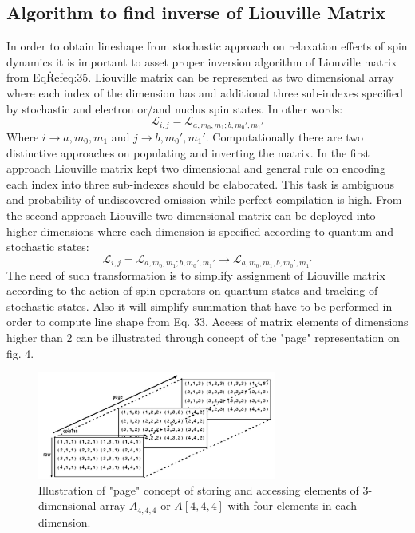 \subsection{Algorithm to find inverse of Liouville Matrix}
In order to obtain lineshape from stochastic approach on relaxation effects of spin dynamics it is important to asset proper inversion algorithm of Liouville matrix from Eq\.Ref{eq:35}. Liouville matrix can be represented as two dimensional array where each index of the dimension has and additional three sub-indexes specified by stochastic and electron or/and nuclus spin states. In other words: 
\begin{equation}\label{eq:53}
\mathcal{L}_{i,j}=\mathcal{L}_{a,m_0,m_1;b,m_0',m_1'}  
\end{equation}  
Where $i\rightarrow a,m_0,m_1$ and $j\rightarrow b,m_0',m_1'$. Computationally there are two distinctive approaches on populating and inverting the matrix. In the first approach Liouville matrix kept two dimensional and general rule on encoding each index into three sub-indexes should be elaborated. This task is ambiguous and probability of undiscovered omission while perfect compilation is high. From the second approach Liouville two dimensional matrix can be deployed into higher dimensions where each dimension is specified according to quantum and stochastic states:  
\begin{equation}\label{eq:54}
\mathcal{L}_{i,j}=\mathcal{L}_{a,m_0,m_1;b,m_0',m_1'}\rightarrow \mathcal{L}_{a,m_0,m_1,b,m_0',m_1'}
\end{equation}
The need of such transformation is to simplify assignment of Liouville matrix according to the action of spin operators on quantum states and tracking of stochastic states. Also it will simplify summation that have to be performed in order to compute line shape from Eq. 33. Access of matrix elements of dimensions higher than 2 can be illustrated through concept of the "page" representation on fig. 4. 
\begin{figure}[h!]
\centering
\includegraphics[width=0.7\textwidth]{figures/chap1/mat.png}
\caption{Illustration of "page" concept of storing and accessing elements of 3-dimensional array $A_{4,4,4}$ or $A[4,4,4]$ with four elements in each dimension.~\cite{Matlab}}
\end{figure}

